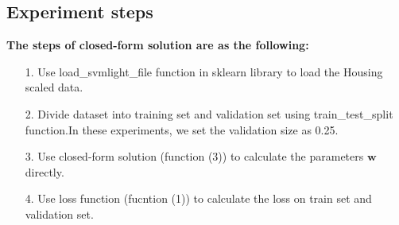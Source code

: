 \documentclass[journal, a4paper]{IEEEtran}
\begin{document}
\subsection{Experiment steps}
 \textbf{The steps of closed-form solution are as the following:}
\begin{itemize}
\item[1.] Use load\_svmlight\_file function in sklearn library to load the Housing scaled data.
\item[2.] Divide dataset into training set and validation set using train\_test\_split function.In these experiments, we set the validation size as 0.25.
\item[3.] Use closed-form solution (function (3)) to calculate the parameters $\boldsymbol{w}$ directly.
\item[4.] Use loss function (fucntion (1)) to calculate the loss on train set and validation set.
\end{itemize}
\end{document}
